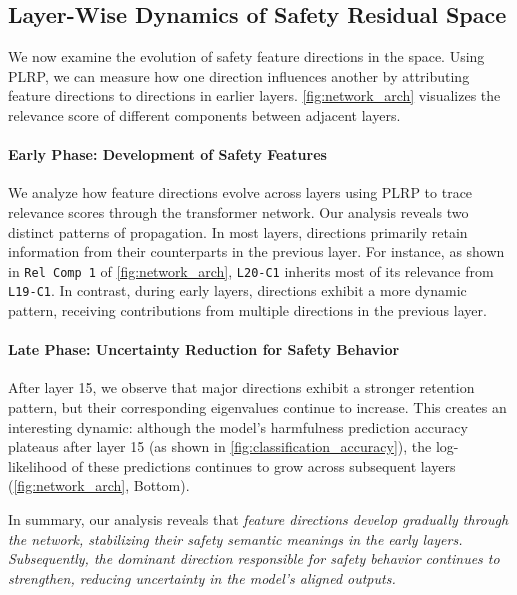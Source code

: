 \subsection{Layer-Wise Dynamics of Safety Residual Space}

We now examine the evolution of safety feature directions in the space. Using PLRP, we can measure how one direction influences another by attributing feature directions to directions in earlier layers. \autoref{fig:network_arch} visualizes the  relevance score of different components between adjacent layers.

\paragraph{Early Phase: Development of Safety Features}
\label{sec:early_phase}
We analyze how feature directions evolve across layers using PLRP to trace relevance scores through the transformer network. Our analysis reveals two distinct patterns of propagation. In most layers, directions primarily retain information from their counterparts in the previous layer. For instance, as shown in \texttt{Rel Comp 1} of \autoref{fig:network_arch}, \texttt{L20-C1} inherits most of its relevance from \texttt{L19-C1}. In contrast, during early layers, directions exhibit a more dynamic pattern, receiving contributions from multiple directions in the previous layer.

\paragraph{Late Phase: Uncertainty Reduction for Safety Behavior}
After layer 15, we observe that major directions exhibit a stronger retention pattern, but their corresponding eigenvalues continue to increase. This creates an interesting dynamic: although the model's harmfulness prediction accuracy plateaus after layer 15 (as shown in \autoref{fig:classification_accuracy}), the log-likelihood of these predictions continues to grow across subsequent layers (\autoref{fig:network_arch}, Bottom).


In summary, our analysis reveals that \emph{feature directions develop gradually through the network, stabilizing their safety semantic meanings in the early layers. Subsequently, the dominant direction responsible for safety behavior continues to strengthen, reducing uncertainty in the model's aligned outputs.}



